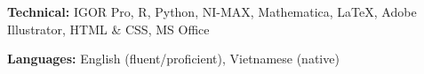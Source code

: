 \documentclass[letter, 10pt]{article}
\newcommand{\longunderline}[1]{\uline{#1\hfill\mbox{}}}
\begin{document}
	\noindent \textbf{Technical:} IGOR Pro, R, Python,  NI-MAX, Mathematica, \LaTeX{}, Adobe Illustrator, HTML \& CSS, MS Office
	
	\noindent \textbf{Languages:} English (fluent/proficient), Vietnamese (native)\\
	\vspace{-7pt}

	

	
%	

	
\end{document}
